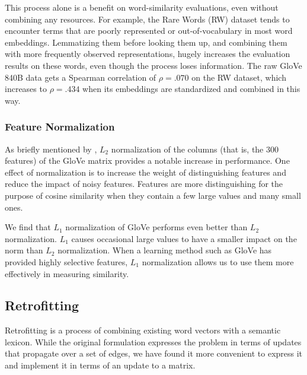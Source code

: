 \documentclass[11pt,letterpaper]{article}
\begin{document}
This process alone is a benefit on word-similarity evaluations, even without
combining any resources. For example, the Rare Words (RW) dataset
\cite{luong2013rw} tends to encounter terms that are poorly represented or
out-of-vocabulary in most word embeddings.  Lemmatizing them before looking
them up, and combining them with more frequently observed representations,
hugely increases the evaluation results on these words, even though the process
loses information. The raw GloVe 840B data gets a Spearman correlation of $\rho
= .070$ on the RW dataset, which increases to $\rho = .434$ when its embeddings
are standardized and combined in this way.


\subsubsection{Feature Normalization}

As briefly mentioned by , $L_2$ normalization of
the columns (that is, the 300 features) of the GloVe matrix provides a notable
increase in performance. One effect of normalization is to increase the weight
of distinguishing features and reduce the impact of noisy features.  Features
are more distinguishing for the purpose of cosine similarity when they contain
a few large values and many small ones.

We find that $L_1$ normalization of GloVe performs even better than $L_2$
normalization. $L_1$ causes occasional large values to have a smaller impact on the norm
than $L_2$ normalization. When a learning method such as GloVe has provided
highly selective features, $L_1$ normalization allows us to use them more effectively
in measuring similarity.


\subsection{Retrofitting}


Retrofitting \cite{faruqui2015retrofitting} is a process of combining existing
word vectors with a semantic lexicon. While the original formulation expresses
the problem in terms of updates that propagate over a set of edges, we have
found it more convenient to express it and implement it in terms of an update
to a matrix.
\end{document}
